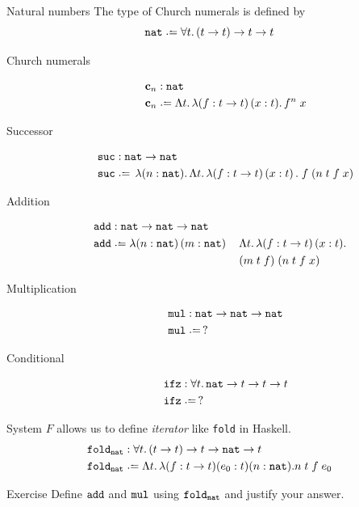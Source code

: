 \begin{frame}[allowframebreaks]{Natural numbers}
The type of Church numerals is defined by 
\[
  \nat \defeq \forall t.\, (t\to t)\to t\to t
\]
  \begin{description}
    \item[Church numerals]
      \begin{align*}
        \bc_n & : \nat \\
        \bc_n & \defeq \Lambda t.\,\lambda (f:t \to t)\,(x:t).\,
        f^n\;x
      \end{align*}
    \item[Successor]
      \begin{align*}
        \suc & : \nat \to \nat \\
        \suc & \defeq \,\lambda (n : \nat).\,\Lambda t.\,\lambda
        (f : t \to t)\,(x:t)\,.\;f\;(n\;t\;f\;x) 
      \end{align*}
    \item[Addition]
      \begin{align*}
        \add & : \nat \to \nat \to \nat \\
        \add & \defeq \lambda (n : \nat)\,(m:\nat)\,&& \Lambda t.\, \lambda
        (f:t\to t)\,(x: t).\\
        &&& (m\;t\;f)\;(n\;t\;f\;x) 
      \end{align*}
    \item[Multiplication] 
      \begin{align*}
       \mul & : \nat\to \nat \to\nat\\
       \mul & \defeq\,?
      \end{align*}
    \item[Conditional]
      \begin{align*}
       \ifz & : \forall t.\,\nat \to t \to t \to t \\
       \ifz & \defeq\,?
      \end{align*}
  \end{description}
System $F$ allows us to define \emph{iterator} like \texttt{fold} in Haskell.
\begin{align*}
  \mathtt{fold}_{\nat} & : \forall t.\, (t \to t) \to t \to \nat \to t  \\
  \mathtt{fold}_{\nat} & \defeq \Lambda t.\, \lambda (f : t \to t)(e_0 : t)(n : \nat). 
  n\;t\;f\;e_0
\end{align*}

%
%
%
\begin{block}{Exercise}
  Define $\mathtt{add}$ and $\mathtt{mul}$ using $\mathtt{fold}_{\mathtt{nat}}$ and justify your
  answer.
  

\end{block}
\end{frame}
